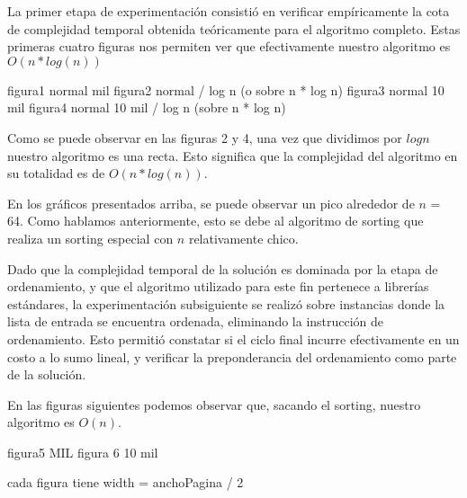 La primer etapa de experimentación consistió en verificar empíricamente la cota de complejidad temporal obtenida teóricamente para el algoritmo completo. Estas primeras cuatro figuras nos permiten ver que efectivamente nuestro algoritmo es $O(n * log(n))$

figura1 normal mil
figura2 normal / log n (o sobre n * log n)
figura3 normal 10 mil
figura4 normal 10 mil / log n (sobre n * log n)

Como se puede observar en las figuras 2 y 4, una vez que dividimos por $log n$ nuestro algoritmo es una recta. Esto significa que la complejidad del algoritmo en su totalidad es de $O(n * log(n))$.

En los gráficos presentados arriba, se puede observar un pico alrededor de $n$ = 64. Como hablamos anteriormente, esto se debe al algoritmo de sorting que realiza un sorting especial con $n$ relativamente chico.

Dado que la complejidad temporal de la solución es dominada por la etapa de ordenamiento, y que el algoritmo utilizado para este fin pertenece a librerías estándares, la experimentación subsiguiente se realizó sobre instancias donde la lista de entrada se encuentra ordenada, eliminando la instrucción de ordenamiento. Esto permitió constatar si el ciclo final incurre efectivamente en un costo a lo sumo lineal, y verificar la preponderancia del ordenamiento como parte de la solución.

En las figuras siguientes podemos observar que, sacando el sorting, nuestro algoritmo es $O(n)$.

figura5 MIL
figura 6 10 mil

cada figura tiene width = anchoPagina / 2